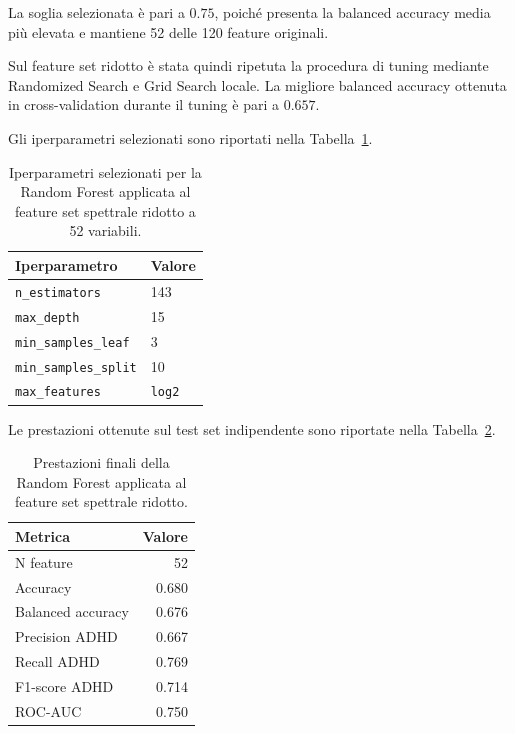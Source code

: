 La soglia selezionata è pari a $0.75$, poiché presenta la balanced
accuracy media più elevata e mantiene 52 delle 120 feature originali.

Sul feature set ridotto è stata quindi ripetuta la procedura di tuning
mediante Randomized Search e Grid Search locale. La migliore balanced
accuracy ottenuta in cross-validation durante il tuning è pari a
$0.657$.

Gli iperparametri selezionati sono riportati nella
Tabella~\ref{tab:rf_reduced_hyperparameters}.

\begin{table}[H]
	\centering
	\begin{tabular}{ll}
		\hline
		\textbf{Iperparametro} & \textbf{Valore} \\
		\hline
		\texttt{n\_estimators} & 143 \\
		\texttt{max\_depth} & 15 \\
		\texttt{min\_samples\_leaf} & 3 \\
		\texttt{min\_samples\_split} & 10 \\
		\texttt{max\_features} & \texttt{log2} \\
		\hline
	\end{tabular}
	\caption{Iperparametri selezionati per la Random Forest applicata
		al feature set spettrale ridotto a 52 variabili.}
	\label{tab:rf_reduced_hyperparameters}
\end{table}

Le prestazioni ottenute sul test set indipendente sono riportate nella
Tabella~\ref{tab:rf_reduced_updated}.

\begin{table}[H]
	\centering
	\begin{tabular}{lr}
		\hline
		\textbf{Metrica} & \textbf{Valore} \\
		\hline
		N feature & 52 \\
		Accuracy & 0.680 \\
		Balanced accuracy & 0.676 \\
		Precision ADHD & 0.667 \\
		Recall ADHD & 0.769 \\
		F1-score ADHD & 0.714 \\
		ROC-AUC & 0.750 \\
		\hline
	\end{tabular}
	\caption{Prestazioni finali della Random Forest applicata al
		feature set spettrale ridotto.}
	\label{tab:rf_reduced_updated}
\end{table}

